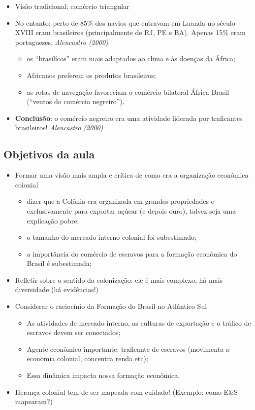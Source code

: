 \documentclass[a4paper,12pt]{article}[abntex2]
\begin{document}
\begin{itemize}
    \item Visão tradicional: comércio triangular
    \item No entanto: perto de 85\% dos navios que entravam em Luanda no século XVIII eram brasileiros (principalmente de RJ, PE e BA). Apenas 15\% eram portugueses. \textit{Alencastro (2000)}
    \begin{itemize}
        \item os “brasilícos” eram mais adaptados ao clima e às doenças da África;
        \item Africanos preferem os produtos brasileiros;
        \item as rotas de navegação favoreciam o comércio bilateral África-Brasil (“ventos do comércio negreiro”).
    \end{itemize}
    \item \textbf{Conclusão}: o comércio negreiro era uma atividade liderada por traficantes brasileiros! \textit{Alencastro (2000)}
\end{itemize}

\subsection{\textbf{Objetivos da aula}}
\begin{itemize}
    \item Formar uma visão mais ampla e crítica de como era a organização econômica colonial
    \begin{itemize}
        \item dizer que a Colônia era organizada em grandes propriedades e exclusivamente para exportar açúcar (e depois ouro), talvez seja uma explicação pobre;
        \item o tamanho do mercado interno colonial foi subestimado;
        \item a importância do comércio de escravos para a formação econômica do Brasil é subestimada;
    \end{itemize}
    \item Refletir sobre o sentido da colonização: ele é mais complexo, há mais diversidade (há evidências!)
\end{itemize}

\begin{itemize}
    \item Considerar o raciocínio da Formação do Brasil no Atlântico Sul
    \begin{itemize}
        \item As atividades de mercado interno, as culturas de exportação e o tráfico de escravos devem ser conectados;
        \item Agente econômico importante: traficante de escravos (movimenta a economia colonial, concentra renda etc);
        \item Essa dinâmica impacta nossa formação econômica.
    \end{itemize}
    \item Herança colonial tem de ser mapeada com cuidado! (Exemplo: como E\&S mapearam?)
\end{itemize}
\newpage
\end{document}
